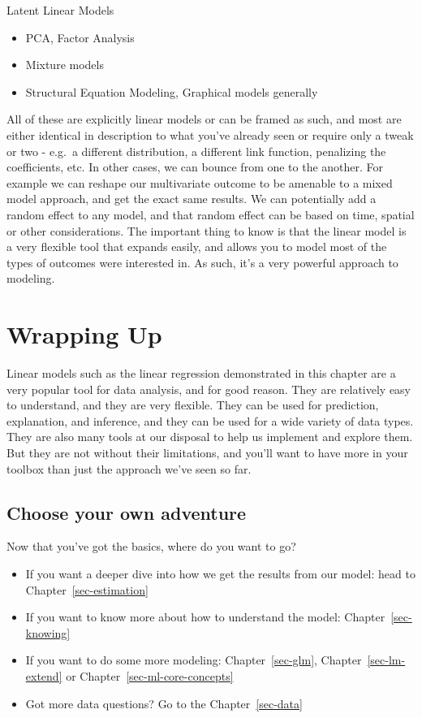 \documentclass[
  letterpaper,
]{krantz}
\providecommand{\tightlist}{%
  \setlength{\itemsep}{0pt}\setlength{\parskip}{0pt}}\usepackage{longtable,booktabs,array}
\begin{document}
Latent Linear Models

\begin{itemize}
\tightlist
\item
  PCA, Factor Analysis
\item
  Mixture models
\item
  Structural Equation Modeling, Graphical models generally
\end{itemize}

All of these are explicitly linear models or can be framed as such, and
most are either identical in description to what you've already seen or
require only a tweak or two - e.g.~a different distribution, a different
link function, penalizing the coefficients, etc. In other cases, we can
bounce from one to the another. For example we can reshape our
multivariate outcome to be amenable to a mixed model approach, and get
the exact same results. We can potentially add a random effect to any
model, and that random effect can be based on time, spatial or other
considerations. The important thing to know is that the linear model is
a very flexible tool that expands easily, and allows you to model most
of the types of outcomes were interested in. As such, it's a very
powerful approach to modeling.

\section{Wrapping Up}\label{sec-lm-wrap}

Linear models such as the linear regression demonstrated in this chapter
are a very popular tool for data analysis, and for good reason. They are
relatively easy to understand, and they are very flexible. They can be
used for prediction, explanation, and inference, and they can be used
for a wide variety of data types. They are also many tools at our
disposal to help us implement and explore them. But they are not without
their limitations, and you'll want to have more in your toolbox than
just the approach we've seen so far.

\subsection{Choose your own adventure}\label{sec-lm-adventure}

Now that you've got the basics, where do you want to go?

\begin{itemize}
\tightlist
\item
  If you want a deeper dive into how we get the results from our model:
  head to Chapter~\ref{sec-estimation}
\item
  If you want to know more about how to understand the model:
  Chapter~\ref{sec-knowing}
\item
  If you want to do some more modeling: Chapter~\ref{sec-glm},
  Chapter~\ref{sec-lm-extend} or Chapter~\ref{sec-ml-core-concepts}
\item
  Got more data questions? Go to the Chapter~\ref{sec-data}
\end{itemize}
\end{document}
